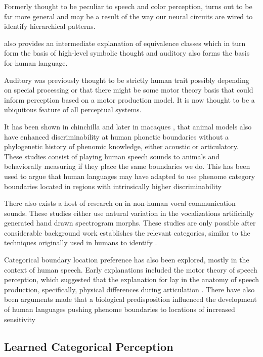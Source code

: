 Formerly thought to be peculiar to speech and color perception, \CP turns out to be far more general and may be a result of the way our neural circuits are wired to identify hierarchical patterns.

\CP also provides an intermediate explanation of equivalence classes which in turn form the basis of high-level symbolic thought and auditory \CP also forms the basis for human language.

Auditory \CP was previously thought to be strictly human trait possibly depending on special processing or that there might be some motor theory basis that could inform perception based on a motor production model. It is now thought to be a ubiquitous feature of all perceptual systems.

It has been shown in chinchilla \cite{kuhl1975speech} and later in macaques \cite{kuhl1983enhanced}, that animal models also have enhanced discriminability at human phonetic boundaries without a phylogenetic history of phenomic knowledge, either acoustic or articulatory.
These studies consist of playing human speech sounds to animals and behaviorally measuring if they place the same boundaries we do.
This has been used to argue that human languages may have adapted to use phenome category boundaries located in regions with intrinsically higher discriminability \cite{stevens1981constraints,goldstone2010categorical}

There also exists a host of research on \CP in non-human vocal communication sounds. These studies either use
natural variation in the vocalizations
artificially generated hand drawn spectrogram morphs.
These studies are only possible after considerable background work establishes the relevant categories, similar to the techniques originally used in humans to identify \CP.

Categorical boundary location preference has also been explored, mostly in the context of human speech. Early explanations included the motor theory of speech perception, which suggested that the explanation for \CP lay in the anatomy of speech production, specifically, physical differences during articulation \cite{liberman1967perception}. There have also been arguments made that a biological predisposition influenced the development of human languages pushing phenome boundaries to locations of increased sensitivity \cite{stevens1981constraints, goldstone2010categorical, halle1979some}

\subsection{Learned Categorical Perception}


